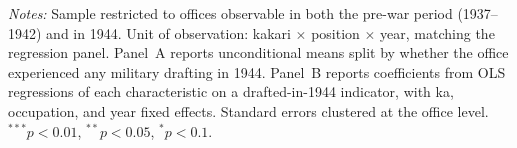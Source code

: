 \begin{table}[htbp]
\begin{threeparttable}
\begin{tablenotes}[flushleft]
\footnotesize
\item \textit{Notes:} Sample restricted to offices observable in both the pre-war period (1937--1942) and in 1944. Unit of observation: kakari $\times$ position $\times$ year, matching the regression panel. Panel~A reports unconditional means split by whether the office experienced any military drafting in 1944. Panel~B reports coefficients from OLS regressions of each characteristic on a drafted-in-1944 indicator, with ka, occupation, and year fixed effects. Standard errors clustered at the office level. $^{***}p<0.01$, $^{**}p<0.05$, $^{*}p<0.1$.
\end{tablenotes}
\end{threeparttable}
\end{table}
